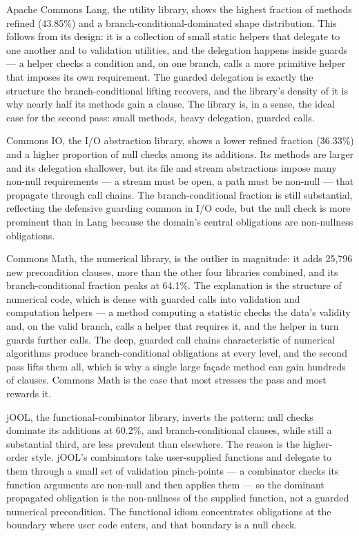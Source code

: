 Apache Commons Lang, the utility library, shows the highest fraction of methods
refined (43.85\%) and a branch-conditional-dominated shape distribution. This
follows from its design: it is a collection of small static helpers that delegate
to one another and to validation utilities, and the delegation happens inside
guards --- a helper checks a condition and, on one branch, calls a more primitive
helper that imposes its own requirement. The guarded delegation is exactly the
structure the branch-conditional lifting recovers, and the library's density of
it is why nearly half its methods gain a clause. The library is, in a sense, the
ideal case for the second pass: small methods, heavy delegation, guarded calls.

Commons IO, the I/O abstraction library, shows a lower refined fraction (36.33\%)
and a higher proportion of null checks among its additions. Its methods are
larger and its delegation shallower, but its file and stream abstractions impose
many non-null requirements --- a stream must be open, a path must be non-null ---
that propagate through call chains. The branch-conditional fraction is still
substantial, reflecting the defensive guarding common in I/O code, but the null
check is more prominent than in Lang because the domain's central obligations are
non-nullness obligations.

Commons Math, the numerical library, is the outlier in magnitude: it adds 25{,}796
new precondition clauses, more than the other four libraries combined, and its
branch-conditional fraction peaks at 64.1\%. The explanation is the structure of
numerical code, which is dense with guarded calls into validation and computation
helpers --- a method computing a statistic checks the data's validity and, on the
valid branch, calls a helper that requires it, and the helper in turn guards
further calls. The deep, guarded call chains characteristic of numerical
algorithms produce branch-conditional obligations at every level, and the second
pass lifts them all, which is why a single large fa\c{c}ade method can gain
hundreds of clauses. Commons Math is the case that most stresses the pass and most
rewards it.

jOOL, the functional-combinator library, inverts the pattern: null checks
dominate its additions at 60.2\%, and branch-conditional clauses, while still a
substantial third, are less prevalent than elsewhere. The reason is the
higher-order style. jOOL's combinators take user-supplied functions and delegate
to them through a small set of validation pinch-points --- a combinator checks
its function arguments are non-null and then applies them --- so the dominant
propagated obligation is the non-nullness of the supplied function, not a guarded
numerical precondition. The functional idiom concentrates obligations at the
boundary where user code enters, and that boundary is a null check.

